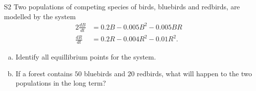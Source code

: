 \begin{problem}{S2}
Two populations of competing species of birds, bluebirds and redbirds, are modelled by the system
\begin{alignat*}{2}
\frac{dB}{dt} &= 0.2B - 0.005B^2 - 0.005BR \\
\frac{dR}{dt} & = 0.2R - 0.004R^2 - 0.01R^2.
\end{alignat*}
\begin{enumerate}[(a)]
\item Identify all equillibrium points for the system.
\item If a forest contains \(50\) bluebirds and \(20\) redbirds, what will happen to the two populations in the long term?
\end{enumerate}
\end{problem}
